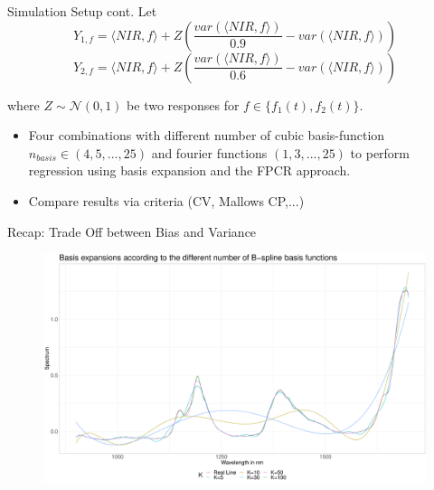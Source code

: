 \documentclass{beamer}
\begin{document}
	
	\begin{frame}{Simulation Setup cont.}
		Let 
		$$Y_{1,f} = \langle NIR, f\rangle + Z\left(  \frac{var(\langle NIR, f\rangle)}{0.9} - var(\langle NIR, f\rangle)\right)$$ 
		$$Y_{2,f} = \langle NIR, f\rangle + Z\left( \frac{var(\langle NIR, f\rangle)}{0.6} - var(\langle NIR, f\rangle)\right)$$
		
		where $Z \sim \mathcal{N}(0,1)$ be two responses for $f \in \{f_1(t), f_2(t)\}$.	
		\begin{itemize}
    		\item Four combinations with different number of cubic basis-function $n_{basis} \in (4,5,...,25)$ and fourier functions $(1,3,...,25)$ to perform regression using basis expansion and the FPCR approach.
			\item Compare results via criteria (CV, Mallows CP,...)
		
		\end{itemize}
	\end{frame}
	
	
	\begin{frame}{Recap: Trade Off between Bias and Variance}
		\begin{figure}\notag
			\includegraphics[width = \textwidth]{../Graphics/basis_expansions.pdf}
		\end{figure}
	\end{frame}
	
	
	
\end{document}
